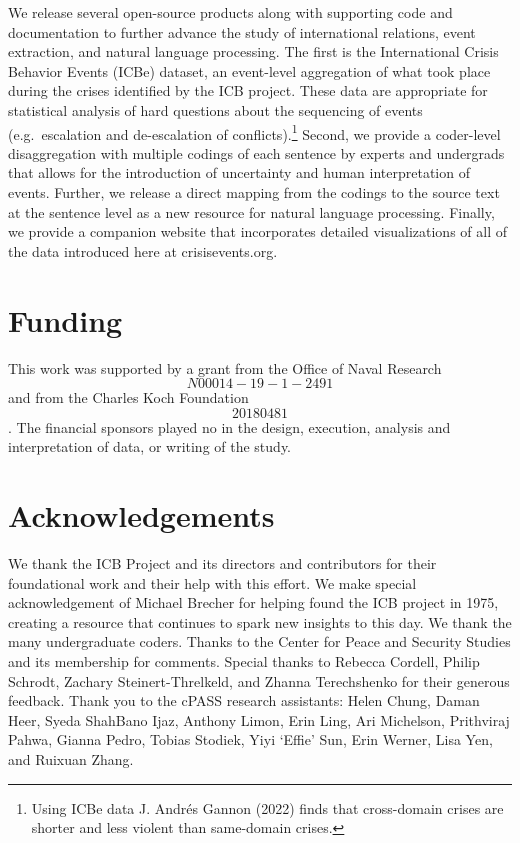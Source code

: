 \documentclass{article}
\begin{document}
We release several open-source products along with supporting code and
documentation to further advance the study of international relations,
event extraction, and natural language processing. The first is the
International Crisis Behavior Events (ICBe) dataset, an event-level
aggregation of what took place during the crises identified by the ICB
project. These data are appropriate for statistical analysis of hard
questions about the sequencing of events (e.g.~escalation and
de-escalation of conflicts).\footnote{Using ICBe data J. Andrés Gannon
  (2022) finds that cross-domain crises are shorter and less violent
  than same-domain crises.} Second, we provide a coder-level
disaggregation with multiple codings of each sentence by experts and
undergrads that allows for the introduction of uncertainty and human
interpretation of events. Further, we release a direct mapping from the
codings to the source text at the sentence level as a new resource for
natural language processing. Finally, we provide a companion website
that incorporates detailed visualizations of all of the data introduced
here at crisisevents.org.

\hypertarget{funding}{%
\section{Funding}\label{funding}}

This work was supported by a grant from the Office of Naval Research
\[N00014-19-1-2491\] and from the Charles Koch Foundation \[20180481\].
The financial sponsors played no in the design, execution, analysis and
interpretation of data, or writing of the study.

\hypertarget{acknowledgements}{%
\section{Acknowledgements}\label{acknowledgements}}

We thank the ICB Project and its directors and contributors for their
foundational work and their help with this effort. We make special
acknowledgement of Michael Brecher for helping found the ICB project in
1975, creating a resource that continues to spark new insights to this
day. We thank the many undergraduate coders. Thanks to the Center for
Peace and Security Studies and its membership for comments. Special
thanks to Rebecca Cordell, Philip Schrodt, Zachary Steinert-Threlkeld,
and Zhanna Terechshenko for their generous feedback. Thank you to the
cPASS research assistants: Helen Chung, Daman Heer, Syeda ShahBano Ijaz,
Anthony Limon, Erin Ling, Ari Michelson, Prithviraj Pahwa, Gianna Pedro,
Tobias Stodiek, Yiyi `Effie' Sun, Erin Werner, Lisa Yen, and Ruixuan
Zhang.
\end{document}
